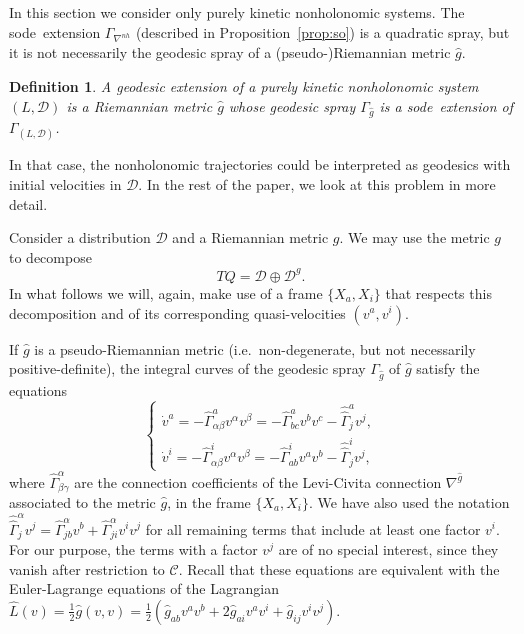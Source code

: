 \documentclass[11pt]{article}
\newtheorem{defi}{Definition}
\def\sode{{\sc sode}}
\def\D{{\mathcal D}}
\def\GLD{{\Gamma_{(L,\mathcal{D})}}}
\begin{document}
In this section we consider only  purely kinetic nonholonomic  systems.  The \sode\ extension  $\Gamma_{\nabla^{nh}}$ (described in Proposition~\ref{prop:so}) is a quadratic spray, but it is not necessarily the geodesic spray of a (pseudo-)Riemannian metric $\hat g$. 

\begin{defi}  A geodesic extension of a purely kinetic nonholonomic system $(L,\D)$ is a Riemannian metric $\hat g$ whose geodesic spray $\Gamma_{\hat g}$ is a \sode\ extension of $\GLD$. 
\end{defi}

In that case, the nonholonomic trajectories could be interpreted as geodesics with initial velocities in $\mathcal{D}$. In the rest of the paper, we  look at this problem in more detail.


Consider a distribution $\D$ and a Riemannian metric $g$. We may use the metric $g$ to decompose
\[
TQ=\D \oplus \D^g.
\]
In what follows we will, again, make use of a frame $\{X_a,X_i\}$ that respects this decomposition and of its corresponding quasi-velocities $(v^a,v^i)$.

If $\hat g$ is a pseudo-Riemannian metric (i.e.\ non-degenerate, but not necessarily positive-definite), the integral curves of the geodesic spray $\Gamma_{\hat{g}}$ of $\hat{g} $ satisfy the equations
$$
\left\{\begin{array}{l}\dot{v}^a=-\hat{\Gamma}^a_{\alpha\beta}v^\alpha v^\beta=-\hat{\Gamma}_{b c}^a v^b v^c-\hat{\hat{\Gamma}}^a_jv^j , \\ 
\dot{v}^i=-\hat{\Gamma}^i_{\alpha\beta}v^\alpha v^\beta=-\hat{\Gamma}_{ab}^i v^a v^b -\hat{\hat{\Gamma}}^i_j v^j ,\end{array}\right.
$$
where $\hat{\Gamma}^\alpha_{\beta \gamma}$ are the connection coefficients of the Levi-Civita connection $\nabla^{\hat{g}}$ associated to the metric $\hat{g}$, in the frame $\{X_a,X_i\}$. {We have also used the notation $\hat{\hat{\Gamma}}^\alpha_jv^j=\hat{\Gamma}^\alpha_{jb}v^b+\hat{\Gamma}^\alpha_{ji}v^iv^j$ for all remaining terms that  include at least one factor $v^i$.} For our purpose, the terms with a factor  $v^j$ are of no special interest, since they vanish after restriction to $\mathcal{C}$. Recall that these equations are equivalent with the Euler-Lagrange equations of the Lagrangian $\hat{L}(v)=
\frac{1}{2}{\hat g}(v,v)= \frac{1}{2}\left(\hat{g}_{a b} v^a v^b+2 \hat{g}_{ai} v^{a} v^i+\hat{g}_{ij} v^i v^j\right)$.
\end{document}
